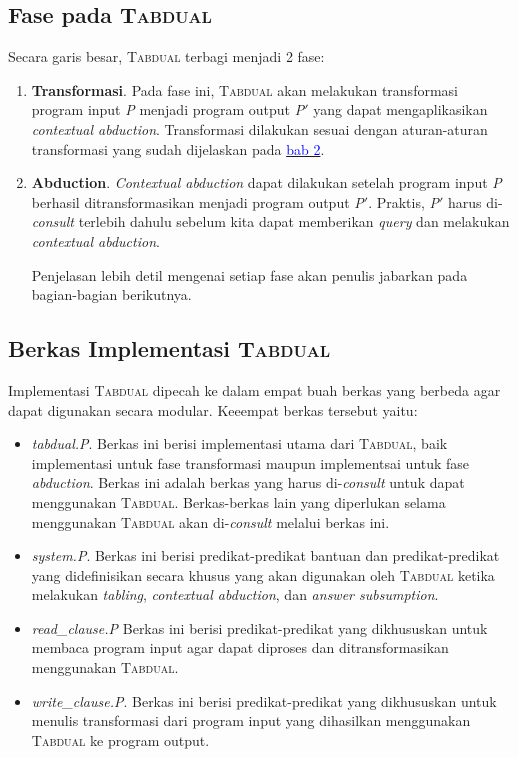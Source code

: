 \subsection{Fase pada \textsc{Tabdual}}

Secara garis besar, \textsc{Tabdual} terbagi menjadi 2 fase:

\begin{enumerate}
	\item \textbf{Transformasi}. Pada fase ini, \textsc{Tabdual} akan melakukan transformasi program input \textit{P} menjadi program output \textit{P$'$} yang dapat mengaplikasikan \textit{contextual abduction}. Transformasi dilakukan sesuai dengan aturan-aturan transformasi yang sudah dijelaskan pada \hyperref[bab2]{\textcolor{blue}{bab 2}}.
	\item \textbf{Abduction}. \textit{Contextual abduction} dapat dilakukan setelah program input \textit{P} berhasil ditransformasikan menjadi program output \textit{P$'$}. Praktis, \textit{P$'$} harus di-\textit{consult} terlebih dahulu sebelum kita dapat memberikan \textit{query} dan melakukan \textit{contextual abduction}.
	
	Penjelasan lebih detil mengenai setiap fase akan penulis jabarkan pada bagian-bagian berikutnya.
\end{enumerate}

\subsection{Berkas Implementasi \textsc{Tabdual}}
Implementasi \textsc{Tabdual} dipecah ke dalam empat buah berkas yang berbeda agar dapat digunakan secara modular. Keeempat berkas tersebut yaitu:

\begin{itemize}
	\item \textit{tabdual.P}. Berkas ini berisi implementasi utama dari \textsc{Tabdual}, baik implementasi untuk fase transformasi maupun implementsai untuk fase \textit{abduction}. Berkas ini adalah berkas yang harus di-\textit{consult} untuk dapat menggunakan \textsc{Tabdual}. Berkas-berkas lain yang diperlukan selama menggunakan \textsc{Tabdual} akan di-\textit{consult} melalui berkas ini.
	\item \textit{system.P}. Berkas ini berisi predikat-predikat bantuan dan predikat-predikat yang didefinisikan secara khusus yang akan digunakan  oleh \textsc{Tabdual} ketika melakukan \textit{tabling}, \textit{contextual abduction}, dan \textit{answer subsumption}. 
	\item \textit{read\_clause.P} Berkas ini berisi predikat-predikat yang dikhususkan untuk membaca program input agar dapat diproses dan ditransformasikan menggunakan \textsc{Tabdual}.
	\item \textit{write\_clause.P}. Berkas ini berisi predikat-predikat yang dikhususkan untuk menulis transformasi dari program input yang dihasilkan menggunakan \textsc{Tabdual} ke program output.
\end{itemize}

